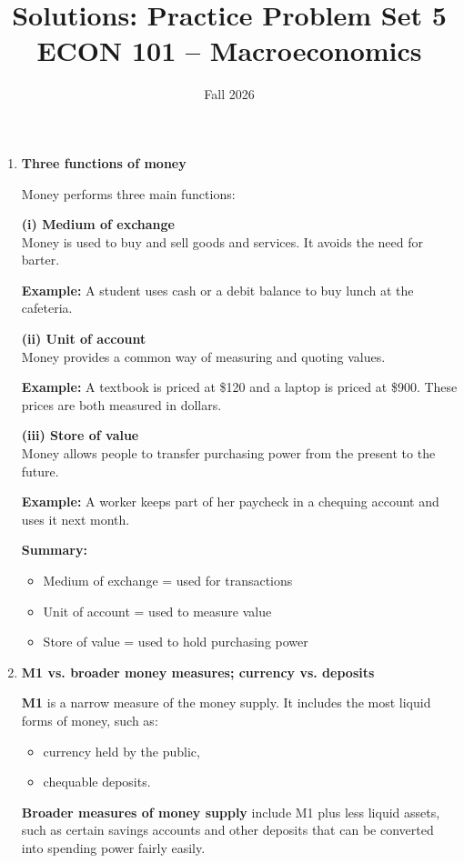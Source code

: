 \documentclass[12pt]{article}
\title{Solutions: Practice Problem Set 5\\ \vspace{10pt} \large ECON 101 -- Macroeconomics}
\author{}
\date{ \vspace{-30pt} Fall 2026}
\begin{document}
\maketitle

\begin{enumerate}[label=\textbf{\arabic*.}]

\item \textbf{Three functions of money}

Money performs three main functions:

\textbf{(i) Medium of exchange}\\
Money is used to buy and sell goods and services. It avoids the need for barter.

\textbf{Example:} A student uses cash or a debit balance to buy lunch at the cafeteria.

\textbf{(ii) Unit of account}\\
Money provides a common way of measuring and quoting values.

\textbf{Example:} A textbook is priced at \$120 and a laptop is priced at \$900. These prices are both measured in dollars.

\textbf{(iii) Store of value}\\
Money allows people to transfer purchasing power from the present to the future.

\textbf{Example:} A worker keeps part of her paycheck in a chequing account and uses it next month.

\textbf{Summary:}
\begin{itemize}
    \item Medium of exchange = used for transactions
    \item Unit of account = used to measure value
    \item Store of value = used to hold purchasing power
\end{itemize}

\item \textbf{M1 vs. broader money measures; currency vs. deposits}

\textbf{M1} is a narrow measure of the money supply. It includes the most liquid forms of money, such as:
\begin{itemize}
    \item currency held by the public,
    \item chequable deposits.
\end{itemize}

\textbf{Broader measures of money supply} include M1 plus less liquid assets, such as certain savings accounts and other deposits that can be converted into spending power fairly easily.


\end{enumerate}
\end{document}
